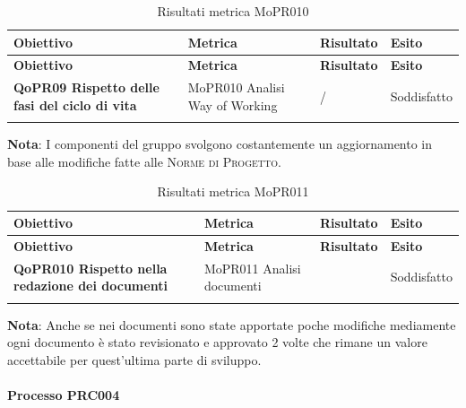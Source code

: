 \renewcommand{\arraystretch}{2} %
\begin{longtable}[H]{>{\centering\bfseries}m{5cm} >{\centering}m{5cm} >{\centering}m{2.5cm} >{\centering\arraybackslash}m{2.5cm}}  
  \rowcolor{lightgray}
  {\textbf{Obiettivo}} & {\textbf{Metrica}} & {\textbf{Risultato}} & {\textbf{Esito}}  \\
  \endfirsthead%
  \rowcolor{lightgray}
  {\textbf{Obiettivo}} & {\textbf{Metrica}} & {\textbf{Risultato}} & {\textbf{Esito}}  \\
  \endhead%
  \textbf{QoPR09 Rispetto delle fasi del ciclo di vita} & MoPR010 Analisi Way of Working & / & Soddisfatto \\
  \caption{Risultati metrica MoPR010}
  \label{tab:my-table}
\end{longtable}
\textbf{Nota}: I componenti del gruppo svolgono costantemente un aggiornamento in base alle modifiche fatte alle \textsc{Norme di Progetto}.

\renewcommand{\arraystretch}{2} %
\begin{longtable}[H]{>{\centering\bfseries}m{5cm} >{\centering}m{5cm} >{\centering}m{2.5cm} >{\centering\arraybackslash}m{2.5cm}}  
  \rowcolor{lightgray}
  {\textbf{Obiettivo}} & {\textbf{Metrica}} & {\textbf{Risultato}} & {\textbf{Esito}}  \\
  \endfirsthead%
  \rowcolor{lightgray}
  {\textbf{Obiettivo}} & {\textbf{Metrica}} & {\textbf{Risultato}} & {\textbf{Esito}}  \\
  \endhead%
  \textbf{QoPR010 Rispetto nella redazione dei documenti} & MoPR011 Analisi documenti & 2 & Soddisfatto \\
  \caption{Risultati metrica MoPR011}
  \label{tab:my-table}
\end{longtable}
\textbf{Nota}: Anche se nei documenti sono state apportate poche modifiche mediamente ogni documento è stato revisionato e approvato 2 volte che rimane un valore accettabile per quest'ultima parte di sviluppo.

\paragraph{Processo PRC004}
\label{sub:processo_PRC004}

